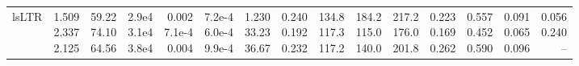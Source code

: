 \begin{landscape}
\begin{table}[t]
{\begin{tabular}{@{}lrrrrrrrrrrrrrr@{}}
lsLTR & \makecell[r]{1.509\\2.337\\2.125} & \makecell[r]{59.22\\74.10\\64.56} & \makecell[r]{2.9e4\\3.1e4\\3.8e4} & \makecell[r]{0.002\\7.1e-4\\0.004} & \makecell[r]{7.2e-4\\6.0e-4\\9.9e-4} & \makecell[r]{1.230\\33.23\\36.67} & \makecell[r]{0.240\\0.192\\0.232} & \makecell[r]{134.8\\117.3\\117.2} & \makecell[r]{184.2\\115.0\\140.0} & \makecell[r]{217.2\\176.0\\201.8} & \makecell[r]{0.223\\0.169\\0.262} & \makecell[r]{0.557\\0.452\\0.590} & \makecell[r]{0.091\\0.065\\0.096} & \makecell[r]{0.056\\0.240\\--} \\

\end{tabular}}
\end{table}
\end{landscape}
